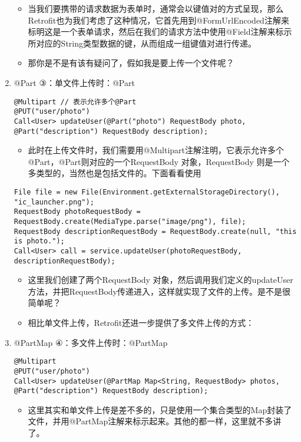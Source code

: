\documentclass[9pt, b5paper]{article}
\begin{document}
\begin{enumerate}
\begin{verbatim}
\end{verbatim}
\begin{itemize}
\item 当我们要携带的请求数据为表单时，通常会以键值对的方式呈现，那么Retrofit也为我们考虑了这种情况，它首先用到@FormUrlEncoded注解来标明这是一个表单请求，然后在我们的请求方法中使用@Field注解来标示所对应的String类型数据的键，从而组成一组键值对进行传递。
\item 那你是不是有该有疑问了，假如我是要上传一个文件呢？
\end{itemize}
\item @Part ③：单文件上传时：@Part
\label{sec-1-2-2-3}
\begin{verbatim}
@Multipart // 表示允许多个@Part
@PUT("user/photo")
Call<User> updateUser(@Part("photo") RequestBody photo, @Part("description") RequestBody description);
\end{verbatim}
\begin{itemize}
\item 此时在上传文件时，我们需要用@Multipart注解注明，它表示允许多个@Part，@Part则对应的一个RequestBody 对象，RequestBody 则是一个多类型的，当然也是包括文件的。下面看看使用
\end{itemize}
\begin{verbatim}
File file = new File(Environment.getExternalStorageDirectory(), "ic_launcher.png");
RequestBody photoRequestBody = RequestBody.create(MediaType.parse("image/png"), file);
RequestBody descriptionRequestBody = RequestBody.create(null, "this is photo.");
Call<User> call = service.updateUser(photoRequestBody, descriptionRequestBody);
\end{verbatim}
\begin{itemize}
\item 这里我们创建了两个RequestBody 对象，然后调用我们定义的updateUser方法，并把RequestBody传递进入，这样就实现了文件的上传。是不是很简单呢？
\item 相比单文件上传，Retrofit还进一步提供了多文件上传的方式：
\end{itemize}
\item @PartMap ④：多文件上传时：@PartMap
\label{sec-1-2-2-4}
\begin{verbatim}
@Multipart
@PUT("user/photo")
Call<User> updateUser(@PartMap Map<String, RequestBody> photos, @Part("description") RequestBody description);
\end{verbatim}
\begin{itemize}
\item 这里其实和单文件上传是差不多的，只是使用一个集合类型的Map封装了文件，并用@PartMap注解来标示起来。其他的都一样，这里就不多讲了。
\end{itemize}
\end{enumerate}
\end{document}
